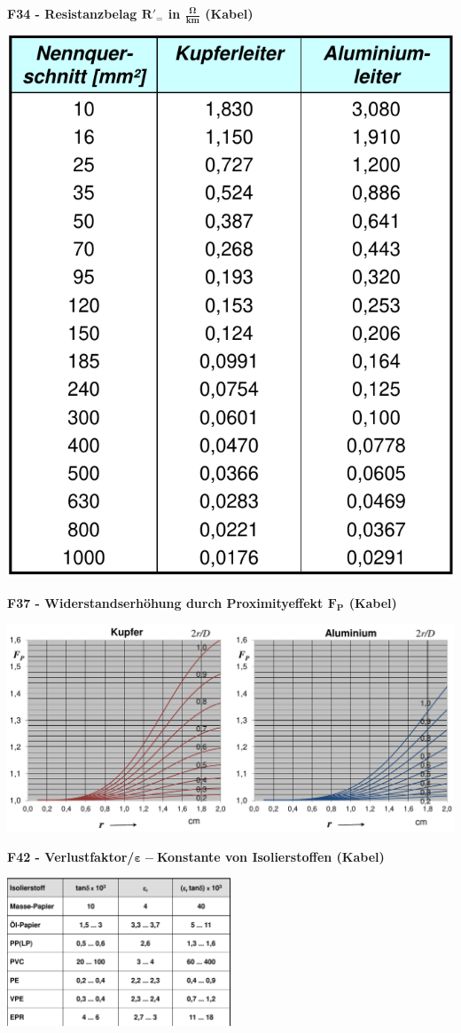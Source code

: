 \newpage


\textbf{F34 - Resistanzbelag $\mathbf{R'_{=}}$ in $\mathbf{\frac{\Omega}{km}}$ (Kabel)}

\includegraphics[width=0.35\columnwidth]{figures/f34_Kabel_Gleichstromwiderstand.png}

\textbf{F37 - Widerstandserhöhung durch Proximityeffekt $\mathbf{F_P}$ (Kabel)}

\includegraphics[width=0.9\columnwidth]{figures/F37_Kabel_Resistanzbelag_Proximityeffekt.png}


\textbf{F42 - Verlustfaktor/$\mathbf{\varepsilon-}$Konstante von Isolierstoffen (Kabel)}

\centering
\includegraphics[width=0.5\textwidth]{figures/f42_verlustfaktor_e-konstante_isostoffe.png}

